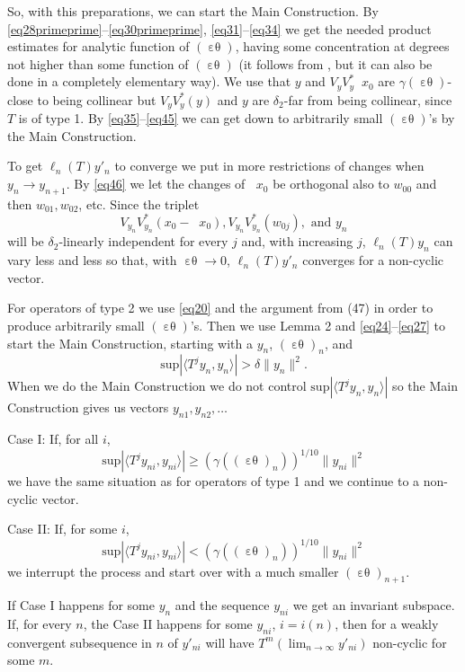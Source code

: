 \documentclass[12pt,oneside,reqno]{amsart}
\theoremstyle{definition}
\DeclareMathOperator*{\VV}{[\,\, ]^{-1}}
\DeclareMathOperator*{\VE}{\varepsilon\theta}
\begin{document}
So, with this preparations, we  can start the Main Construction. By \eqref{eq28primeprime}--\eqref{eq30primeprime}, \eqref{eq31}--\eqref{eq34} we get the needed product estimates for analytic function of $(\VE)$, having some concentration at degrees not higher than some function of $(\VE)$ (it follows from \cite{BeauzamyEnflo}, but it can also be done in a completely elementary way).  We use that $y$ and $V_y V_y^* \VV x_0$ are $\gamma (\VE)$-close to being collinear but $V_y V_y^* (y)$ and $y$ are $\delta_2$-far from being collinear, since $T$ is of type 1. By \eqref{eq35}--\eqref{eq45} we can get down to  arbitrarily small $(\VE)$'s by the Main Construction.

To get $\ell_n(T) y'_n$ to converge we put in more restrictions of changes when $y_n \rightarrow y_{n+1}$. By \eqref{eq46} we let the changes of $\VV x_0$ be orthogonal also to $w_{00}$ and then $w_{01}, w_{02}$, etc. Since the triplet 
$$V_{y_n} V_{y_n}^* (x_0 - \VV x_0), V_{y_n} V_{y_n}^* (w_{0j}), \text{ and } y_n$$
will be $\delta_2$-linearly independent for every $j$ and, with increasing $j$, $\ell_n (T) y_n$ can vary less and less so that,  with $\VE \rightarrow 0$, $\ell_n(T) y'_n$ converges for a non-cyclic vector.

For operators of type 2 we use \eqref{eq20} and the argument from (47) in order to produce arbitrarily small $(\VE)$'s. Then we use Lemma 2 and \eqref{eq24}--\eqref{eq27} to start the Main Construction, starting with a $y_n$, $(\VE)_n$, and 
$$\text{sup} |\langle T^j y_n, y_n\rangle | > \delta \|y_n\|^2.$$
When we do the Main Construction we do not control $\text{sup} |\langle T^j y_n, y_n\rangle |$ so the Main Construction gives us vectors $y_{n1}, y_{n2}, \ldots$ 

Case I: If, for all $i$,  
$$\text{sup}\left| \langle T^j y_{ni}, y_{ni}\rangle\right| \ge \left( \gamma ((\VE)_n)\right)^{1/10} \|y_{ni}\|^2$$
we have the same situation as for operators of type 1 and we continue to a non-cyclic vector.

Case II: If, for some $i$, 
$$\text{sup}\left| \langle T^j y_{ni}, y_{ni}\rangle\right| < \left( \gamma ((\VE)_n)\right)^{1/10} \|y_{ni}\|^2$$
we interrupt the process and start over with a much smaller $(\VE)_{n+1}$. 

If Case I happens for some $y_n$ and the sequence $y_{ni}$ we get an invariant subspace. If, for every $n$, the Case II happens for some $y_{ni}$, $i = i(n)$, then for a weakly convergent subsequence in $n$ of $y'_{ni}$ will have $\displaystyle T^m (\lim_{n \rightarrow \infty} y'_{ni})$ non-cyclic for some $m$.\\
\end{document}
